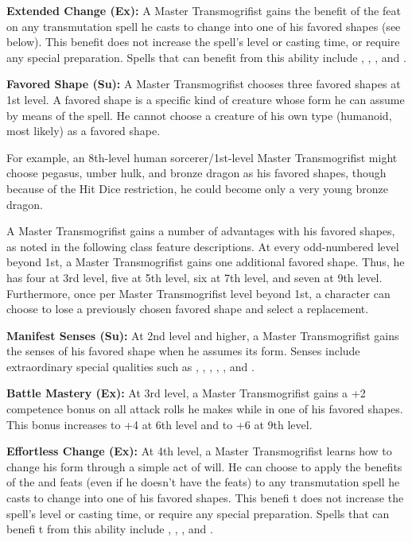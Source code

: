\textbf{Extended Change (Ex):} A Master Transmogrifist gains the benefit of the  feat on any transmutation spell he casts to change into one of his favored shapes (see below). This benefit does not increase the spell’s level or casting time, or require any special preparation. Spells that can benefit from this ability include , , , and .

\textbf{Favored Shape (Su):} A Master Transmogrifist chooses three favored shapes at 1st level. A favored shape is a specific kind of creature whose form he can assume by means of the  spell. He cannot choose a creature of his own type (humanoid, most likely) as a favored shape.

For example, an 8th-level human sorcerer/1st-level Master Transmogrifist might choose pegasus, umber hulk, and bronze dragon as his favored shapes, though because of the Hit Dice restriction, he could become only a very young bronze dragon.

A Master Transmogrifist gains a number of advantages with his favored shapes, as noted in the following class feature descriptions. At every odd-numbered level beyond 1st, a Master Transmogrifist gains one additional favored shape. Thus, he has four at 3rd level, five at 5th level, six at 7th level, and seven at 9th level. Furthermore, once per Master Transmogrifist level beyond 1st, a character can choose to lose a previously chosen favored shape and select a replacement.

\textbf{Manifest Senses (Su):} At 2nd level and higher, a Master Transmogrifist gains the senses of his favored shape when he assumes its form. Senses include extraordinary special qualities such as , , , , , and .

\textbf{Battle Mastery (Ex):} At 3rd level, a Master Transmogrifist gains a +2 competence bonus on all attack rolls he makes while in one of his favored shapes. This bonus increases to +4 at 6th level and to +6 at 9th level.

\textbf{Effortless Change (Ex):} At 4th level, a Master Transmogrifist learns how to change his form through a simple act of will. He can choose to apply the benefits of the  and  feats (even if he doesn’t have the feats) to any transmutation spell he casts to change into one of his favored shapes. This benefi t does not increase the spell’s level or casting time, or require any special preparation. Spells that can benefi t from this ability include , , , and .


